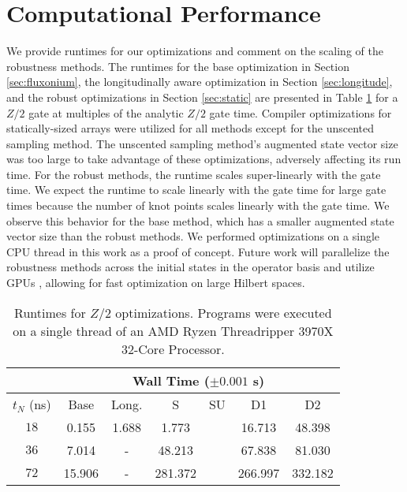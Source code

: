 \section{Computational Performance \label{appendix:time}}
We provide runtimes for our optimizations and comment on the scaling of the
robustness methods. The runtimes for
the base optimization in Section \ref{sec:fluxonium},
the longitudinally aware optimization in Section \ref{sec:longitude},
and the robust optimizations in Section \ref{sec:static}
are presented in Table \ref{tab:time}
for a $Z/2$ gate at multiples of the analytic $Z/2$ gate time.
Compiler optimizations for statically-sized arrays were utilized
for all methods except for the unscented sampling method.
The unscented sampling method's augmented state vector size
was too large to take advantage of these optimizations,
adversely affecting its run time.
For the robust methods, the runtime scales super-linearly with the
gate time. We expect the runtime to scale linearly with the gate time
for large gate times because
the number of knot points scales linearly with the gate time.
We observe this behavior for the base method, which has a smaller
augmented state vector size than the robust methods.
We performed optimizations on a single CPU thread in this work as a proof
of concept. Future work will parallelize the robustness
methods across the initial states in the operator basis and utilize GPUs
\cite{leung2017speedup},
allowing for fast optimization on large Hilbert spaces.

\begin{table}[ht!]
  \begin{tabular} {c | c | c | c | c | c | c}
    & \multicolumn{6}{c}{Wall Time ($\pm 0.001$ s)}\\
    \hline
    $t_{N}$ (ns) & Base & Long. & S & SU & D1 & D2\\
    \hline
    $18$ & 0.155 & 1.688 & 1.773 & & 16.713 & 48.398\\ %
    $36$ & 7.014 & - & 48.213 & & 67.838 & 81.030\\
    $72$ & 15.906 & - & 281.372 & & 266.997 & 332.182\\
  \end{tabular}
  \caption{
    Runtimes for $Z/2$ optimizations.
    Programs were executed on a single thread of an
    AMD Ryzen Threadripper 3970X 32-Core Processor.
  }
  \label{tab:time}
\end{table}

